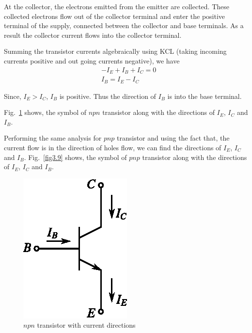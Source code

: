 At the collector, the electrons emitted from the emitter are collected. These collected electrons flow out of the collector terminal and enter the positive terminal of the supply, connected between the collector and base terminals. As a result the collector current flows into the collector terminal.

Summing the transistor currents algebraically using KCL (taking incoming currents positive and out going currents negative), we have
\begin{align}
& -I_{E}+I_{B}+I_{C}=0\label{eq3.1}\\
& I_{B}=I_{E}-I_{C}\label{eq3.2}
\end{align}

Since, $I_{E}>I_{C}$, $I_{B}$ is positive. Thus the direction of $I_{B}$ is into the base terminal.

Fig.~\ref{fig3.8} shows, the symbol of $npn$ transistor along with the directions of $I_{E}$, $I_{C}$ and $I_{B}$.

\vfill\eject

Performing the same analysis for $pnp$ transistor and using the fact that, the current flow is in the direction of holes flow, we can find the directions of $I_{E}$, $I_{C}$ and $I_{B}$. Fig.~\ref{fig3.9} shows, the symbol of $pnp$ transistor along with the directions of $I_{E}$, $I_{C}$ and $I_{B}$.
\begin{figure}[H]
\centering
\includegraphics{chap2/fig2.8.eps}
\caption{$npn$ transistor with current directions}\label{fig3.8}
\end{figure}

